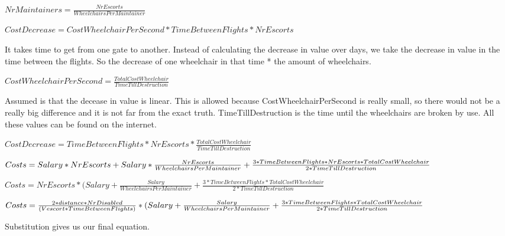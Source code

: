 \documentclass[a4paper, 11pt, notitlepage]{report}
\begin{document}
\begin{description}
	\item $NrMaintainers = \frac{NrEscorts}{WheelchairsPerMaintainer}$
	\item
	\item $CostDecrease  = CostWheelchairPerSecond * TimeBetweenFlights * NrEscorts$
	\item[Explanation:] It takes time to get from one gate to another. Instead of calculating the decrease in value over days, we take the decrease in value in the time between the flights. So the decrease of one wheelchair in that time * the amount of wheelchairs.
	\item $CostWheelchairPerSecond = \frac{TotalCostWheelchair}{TimeTillDestruction}$
	\item[Explanation:] Assumed is that the decease in value is linear. This is allowed because CostWheelchairPerSecond is really small, so there would not be a really big difference and it is not far from the exact truth. TimeTillDestruction is the time until the wheelchairs are broken by use. All these values can be found on the internet.
	\item $CostDecrease  = TimeBetweenFlights * NrEscorts * \frac{TotalCostWheelchair}{TimeTillDestruction}$
	\item
	\item $Costs = Salary * NrEscorts + Salary * \frac{NrEscorts}{WheelchairsPerMaintainer} \\ \\+ \frac{3* TimeBetweenFlights * NrEscorts * TotalCostWheelchair}{2*TimeTillDestruction}$
	\item $Costs = NrEscorts * (Salary + \frac{Salary}{WheelchairsPerMaintainer} + \frac{3* TimeBetweenFlights * TotalCostWheelchair}{2*TimeTillDestruction}$
	\item $Costs = \frac{2*distance*NrDisabled}{(Vescort*TimeBetweenFlights)} * \\ \\(Salary + \frac{Salary}{WheelchairsPerMaintainer} + \frac{3* TimeBetweenFlights * TotalCostWheelchair}{2*TimeTillDestruction}$
	\item[Explanation:] Substitution gives us our final equation.
	\item

\end{description}
\end{document}
